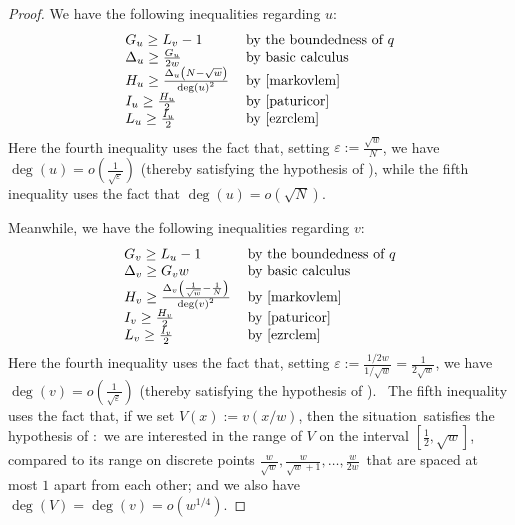 \documentclass[10pt,a4paper]{article}
\newcommand{\<}{\langle}
\renewcommand{\>}{\rangle}
\begin{document}
\begin{proof}
We have the following inequalities regarding $u$:
\begin{equation}
\begin{tabular}
[c]{ll}
$G_{u}\geq L_{v}-1$ & by the boundedness of $q$\\
$\Delta_{u}\geq\frac{G_{u}}{2w}$ & by basic calculus\\
$H_{u}\geq\frac{\Delta_{u}\left(  N-\sqrt{w}\right)  }{\deg\left(  u\right)
^{2}}$ & by \Cref{markovlem}\\
$I_{u}\geq\frac{H_{u}}{2}$ & by \Cref{paturicor}\\
$L_{u}\geq\frac{I_{u}}{2}$ & by \Cref{ezrclem}
\end{tabular}
\end{equation}
Here the fourth inequality uses the fact that, setting $\varepsilon
:=\frac{\sqrt{w}}{N}$, we have $\deg\left(  u\right)  =o\left(  \frac{1}
{\sqrt{\varepsilon}}\right)  $ (thereby satisfying the hypothesis of ), while the fifth inequality uses the fact that $\deg\left(
u\right)  =o\left(  \sqrt{N}\right)  $.

Meanwhile, we have the following inequalities regarding $v$:
\begin{equation}
\begin{tabular}
[c]{ll}
$G_{v}\geq L_{u}-1$ & by the boundedness of $q$\\
$\Delta_{v}\geq G_{v}w$ & by basic calculus\\
$H_{v}\geq\frac{\Delta_{v}\left(  \frac{1}{\sqrt{w}}-\frac{1}{N}\right)
}{\deg\left(  v\right)  ^{2}}$ & by \Cref{markovlem}\\
$I_{v}\geq\frac{H_{v}}{2}$ & by \Cref{paturicor}\\
$L_{v}\geq\frac{I_{v}}{2}$ & by \Cref{ezrclem}
\end{tabular}
\end{equation}
Here the fourth inequality uses the fact that, setting $\varepsilon
:=\frac{1/2w}{1/\sqrt{w}}=\frac{1}{2\sqrt{w}}$, we have $\deg\left(  v\right)
=o\left(  \frac{1}{\sqrt{\varepsilon}}\right)  $ (thereby satisfying the
hypothesis of ). \ The fifth inequality uses the fact
that, if we set $V\left(  x\right)  :=v\left(  x/w\right)  $, then the
situation\ satisfies the hypothesis of :\ we are interested
in the range of $V$ on the interval $\left[  \frac{1}{2},\sqrt{w}\right]  $,
compared to its range on discrete points $\frac{w}{\sqrt{w}},\frac{w}{\sqrt
{w}+1},\ldots,\frac{w}{2w}$\ that are spaced at most $1$ apart from each
other; and we also have $\deg\left(  V\right)  =\deg\left(  v\right)
=o\left(  w^{1/4}\right)  $.


\end{proof}
\end{document}
